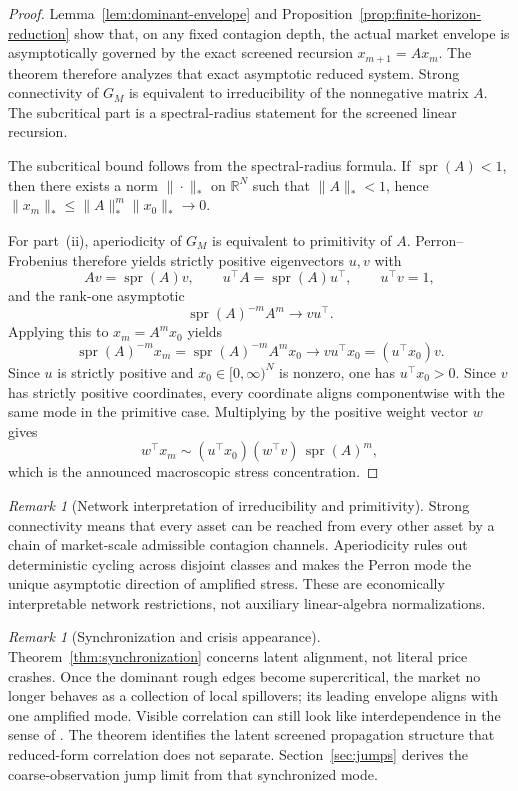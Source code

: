 \documentclass[11pt,a4paper]{amsart}
\theoremstyle{plain}
\theoremstyle{definition}
\theoremstyle{remark}
\newtheorem{remark}[theorem]{Remark}
\DeclareMathOperator{\spr}{spr}
\newcommand{\R}{\mathbb{R}}
\begin{document}
\begin{proof}
Lemma~\ref{lem:dominant-envelope} and
Proposition~\ref{prop:finite-horizon-reduction} show that, on any fixed contagion depth, the
actual market envelope is asymptotically governed by the exact screened recursion
\(x_{m+1}=Ax_m\).  The theorem therefore analyzes that exact asymptotic reduced system.
Strong connectivity of \(G_M\) is equivalent to irreducibility of the nonnegative matrix \(A\).  The
subcritical part is a spectral-radius statement for the screened linear recursion.

The subcritical bound follows from the spectral-radius formula.  If \(\spr(A)<1\), then there
exists a norm \(\|\cdot\|_*\) on \(\R^N\) such that \(\|A\|_*<1\), hence
\(\|x_m\|_*\le \|A\|_*^m\|x_0\|_*\to0\).

For part~(ii), aperiodicity of \(G_M\) is equivalent to primitivity of \(A\).  Perron--Frobenius
therefore yields strictly positive eigenvectors \(u,v\) with
\[
        A v=\spr(A)v,
        \qquad
        u^\top A=\spr(A)u^\top,
        \qquad
        u^\top v=1,
\]
and the rank-one asymptotic
\[
        \spr(A)^{-m}A^m\to vu^\top.
\]
Applying this to \(x_m=A^m x_0\) yields
\[
        \spr(A)^{-m}x_m
        =
        \spr(A)^{-m}A^m x_0
        \to
        vu^\top x_0
        =
        (u^\top x_0)v.
\]
Since \(u\) is strictly positive and \(x_0\in[0,\infty)^N\) is nonzero, one has \(u^\top x_0>0\).
Since \(v\) has strictly positive coordinates, every coordinate aligns componentwise with the
same mode in the primitive case.  Multiplying by the positive weight vector \(w\) gives
\[
        w^\top x_m
        \sim
        (u^\top x_0)(w^\top v)\,\spr(A)^m,
\]
which is the announced macroscopic stress concentration.
\end{proof}

\begin{remark}[Network interpretation of irreducibility and primitivity]
Strong connectivity means that every asset can be reached from every other asset by a chain of
market-scale admissible contagion channels.  Aperiodicity rules out deterministic cycling across
disjoint classes and makes the Perron mode the unique asymptotic direction of amplified stress.
These are economically interpretable network restrictions, not auxiliary linear-algebra
normalizations.
\end{remark}

\begin{remark}[Synchronization and crisis appearance]
Theorem~\ref{thm:synchronization} concerns latent alignment, not literal price crashes.  Once the
dominant rough edges become supercritical, the market no longer behaves as a collection of local
spillovers; its leading envelope aligns with one amplified mode.  Visible correlation can still look
like interdependence in the sense of \cite{forbes2002interdependence}.  The theorem identifies the
latent screened propagation structure that reduced-form correlation does not separate.
Section~\ref{sec:jumps} derives the coarse-observation jump limit from that synchronized mode.
\end{remark}
\end{document}
